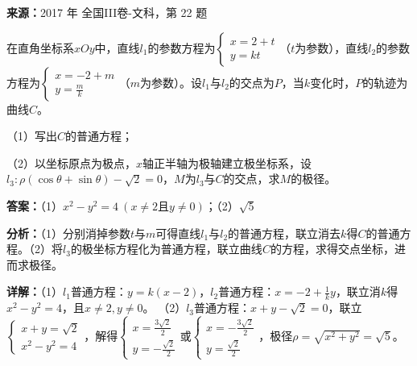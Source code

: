 \begin{question}[points=10]
\textbf{来源：}2017 年 全国III卷-文科，第 22 题\par
[选修4-4：坐标系与参数方程]

在直角坐标系$xOy$中，直线$l_1$的参数方程为$\begin{cases} x=2+t\\ y=kt \end{cases}$（$t$为参数），直线$l_2$的参数方程为$\begin{cases} x=-2+m\\ y=\frac{m}{k} \end{cases}$（$m$为参数）。设$l_1$与$l_2$的交点为$P$，当$k$变化时，$P$的轨迹为曲线$C$。

（1）写出$C$的普通方程；

（2）以坐标原点为极点，$x$轴正半轴为极轴建立极坐标系，设$l_3:\rho(\cos\theta+\sin\theta)-\sqrt{2}=0$，$M$为$l_3$与$C$的交点，求$M$的极径。
\begin{solution}
\textbf{答案：}（1）$x^2-y^2=4\ (x\neq 2且y\neq 0)$；（2）$\sqrt{5}$

\textbf{分析：}（1）分别消掉参数$t$与$m$可得直线$l_1$与$l_2$的普通方程，联立消去$k$得$C$的普通方程。（2）将$l_3$的极坐标方程化为普通方程，联立曲线$C$的方程，求得交点坐标，进而求极径。

\textbf{详解：}（1）$l_1$普通方程：$y=k(x-2)$，$l_2$普通方程：$x=-2+\frac{1}{k}y$，联立消$k$得$x^2-y^2=4$，且$x\neq 2,y\neq 0$。
（2）$l_3$普通方程：$x+y-\sqrt{2}=0$，联立$\begin{cases} x+y=\sqrt{2}\\ x^2-y^2=4 \end{cases}$，解得$\begin{cases} x=\frac{3\sqrt{2}}{2}\\ y=-\frac{\sqrt{2}}{2} \end{cases}$或$\begin{cases} x=-\frac{3\sqrt{2}}{2}\\ y=\frac{\sqrt{2}}{2} \end{cases}$，极径$\rho=\sqrt{x^2+y^2}=\sqrt{5}$。
\end{solution}
\end{question}

